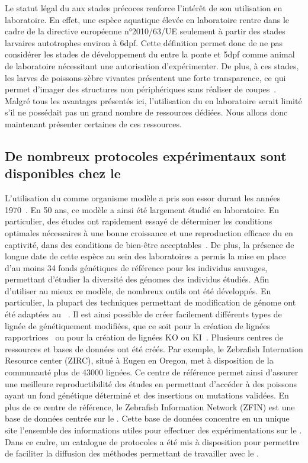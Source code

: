 \documentclass[\main/main.tex]{subfiles}
\begin{document}
Le statut légal du \pz{} aux stades précoces renforce l'intérêt de son utilisation en laboratoire.
%
En effet, une espèce aquatique élevée en laboratoire rentre dans le cadre de la directive européenne n°2010/63/UE seulement à partir des stades larvaires autotrophes environ à 6dpf.
%
Cette définition permet donc de ne pas considérer les stades de développement du \pz{} entre la ponte et 5dpf comme animal de laboratoire nécessitant une autorisation d'expérimenter.
%
De plus, à ces stades, les larves de poissons-zèbre vivantes présentent une forte transparence,
ce qui permet d'imager des structures non périphériques sans réaliser de coupes~\cite{asokan_2020,chen_2020,hamilton_2016,kioka_2020}.
%
Malgré tous les avantages présentés ici, l'utilisation du \pz{} en laboratoire serait limité s'il ne possédait pas un grand nombre de ressources dédiées.
%
Nous allons donc maintenant présenter certaines de ces ressources.

    \subsection{De nombreux protocoles expérimentaux sont disponibles chez le \pz{}}
    
%
L'utilisation du \pz{} comme organisme modèle a pris son essor durant les années 1970~\cite{laale_1977}.
%
En 50 ans, ce modèle a ainsi été largement étudié en laboratoire.
%
En particulier, des études ont rapidement essayé de déterminer les conditions optimales nécessaires à une bonne croissance et une reproduction efficace du \pz{} en captivité, dans des conditions de bien-être acceptables~\cite{eaton_1974,eaton_1974a}.
%
De plus, la présence de longue date de cette espèce au sein des laboratoires a permis la mise en place d'au moins 34 fonds génétiques de référence pour les individus sauvages,
permettant d'étudier la diversité des génomes des individus étudiés.
%
Afin d'utiliser au mieux ce modèle, de nombreux outils ont été développés.
%
En particulier, la plupart des techniques permettant de modification de génome ont été adaptées au \pz{}~\cite{auer_2014,irion_2014,foley_2009,bill_2009}.
%
Il est ainsi possible de créer facilement différents types de lignée de \pz{} génétiquement modifiées, que ce soit pour la création de lignées rapportrices~\cite{brion_2012,goldman_2001} ou pour la création de lignées KO ou KI~\cite{liu_2019}.
%
Plusieurs centres de ressources et bases de données ont été créés.
%
Par exemple, le Zebrafish Internation Resource center (ZIRC), situé à Eugen en Oregon, met à disposition de la communauté plus de 43000 lignées.
%
Ce centre de référence permet ainsi d'assurer une meilleure reproductibilité des études
en permettant d'accéder à des poissons ayant un fond génétique déterminé et des insertions ou mutations validées.
%
En plus de ce centre de référence, le Zebrafish Information Network (ZFIN) est une base de données centrée sur le \pz{}.
%
Cette base de données concentre en un unique site l'ensemble des informations utiles pour effectuer des expérimentations sur le \pz{}.
%
Dans ce cadre, un catalogue de protocoles a été mis à disposition pour permettre de faciliter la diffusion des méthodes permettant de travailler avec le \pz{}.
\end{document}
